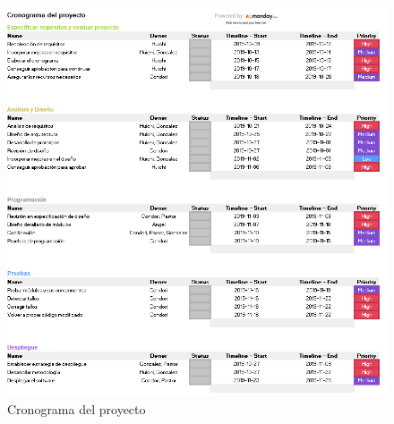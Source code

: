 \documentclass[preprint,12pt]{elsarticle}
\begin{document}
\begin{figure}[htb]
	\begin{center}
		\includegraphics[width=14cm]{./IMAGENES/Gannt} 
		\caption{Cronograma del proyecto}
	\end{center}
\end{figure}




	
	\newpage
	
		 
	
	
\end{document}
